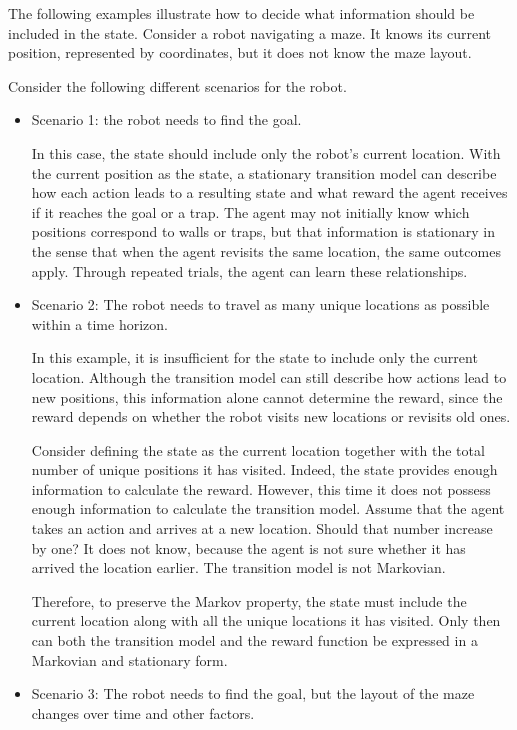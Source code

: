 \begin{mdframed}
	The following examples illustrate how to decide what information should be included in the state. Consider a robot navigating a maze. It knows its current position, represented by coordinates, but it does not know the maze layout. 
	
	Consider the following different scenarios for the robot.
	
	\begin{itemize}
		\item Scenario 1: the robot needs to find the goal.
		
		In this case, the state should include only the robot’s current location. With the current position as the state, a stationary transition model can describe how each action leads to a resulting state and what reward the agent receives if it reaches the goal or a trap. The agent may not initially know which positions correspond to walls or traps, but that information is stationary in the sense that when the agent revisits the same location, the same outcomes apply. Through repeated trials, the agent can learn these relationships.
		
		\item Scenario 2: The robot needs to travel as many unique locations as possible within a time horizon.
		
		In this example, it is insufficient for the state to include only the current location. Although the transition model can still describe how actions lead to new positions, this information alone cannot determine the reward, since the reward depends on whether the robot visits new locations or revisits old ones.
		
		Consider defining the state as the current location together with the total number of unique positions it has visited. Indeed, the state provides enough information to calculate the reward. However, this time it does not possess enough information to calculate the transition model. Assume that the agent takes an action and arrives at a new location. Should that number increase by one? It does not know, because the agent is not sure whether it has arrived the location earlier. The transition model is not Markovian.
		
		Therefore, to preserve the Markov property, the state must include the current location along with all the unique locations it has visited. Only then can both the transition model and the reward function be expressed in a Markovian and stationary form.
		
		\item Scenario 3: The robot needs to find the goal, but the layout of the maze changes over time and other factors.
		

\end{itemize}
\end{mdframed}
